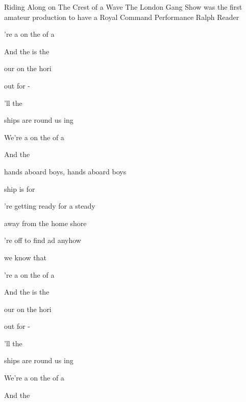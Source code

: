 \begin{SBSong}{Riding Along on The Crest of a Wave}
  {The London Gang Show was the first amateur production to have a Royal Command Performance}
  {Ralph Reader}
  \begin{SBChorus}
    're  a on the  of a 
	
    And the  is  the  

     our  on the  hori

     out for - 

    'll  the 
	
      ships are round us ing
	
    We're  a on the  of a  
	
    And the   
  \end{SBChorus}
  
  \begin{SBVerse}
     hands aboard boys,   hands aboard boys

     ship is  for  	

    're getting ready  for a steady

     away from the home shore

    're off to find ad anyhow

     we know that  
  \end{SBVerse}
  \begin{SBChorus}
    're  a on the  of a 
	
    And the  is  the  

     our  on the  hori

     out for - 

    'll  the 
	
      ships are round us ing
	
    We're  a on the  of a  
	
    And the   
  \end{SBChorus}
\end{SBSong}
  
